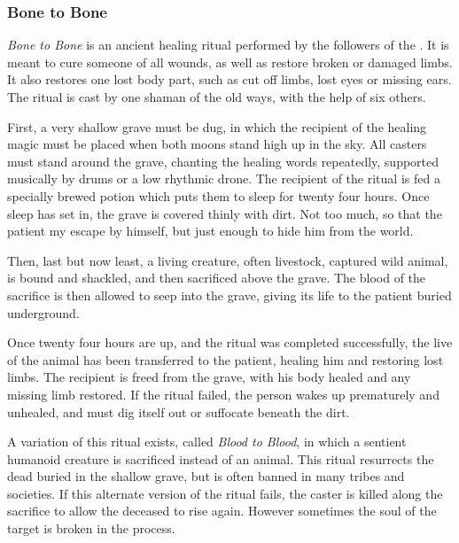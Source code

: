 \subsubsection{Bone to Bone}
\label{sec:Bone to Bone}


\emph{Bone to Bone} is an ancient healing ritual performed by the followers of
the . It is meant to cure someone of all wounds, as well
as restore broken or damaged limbs. It also restores one lost body part, such
as cut off limbs, lost eyes or missing ears. The ritual is cast by one shaman of
the old ways, with the help of six others.

First, a very shallow grave must be dug, in which the recipient of the healing
magic must be placed when both moons stand high up in the sky. All casters must
stand around the grave, chanting the healing words repeatedly, supported
musically by drums or a low rhythmic drone. The recipient of the ritual is fed
a specially brewed potion which puts them to sleep for twenty four hours. Once
sleep has set in, the grave is covered thinly with dirt. Not too much, so that
the patient my escape by himself, but just enough to hide him from the world.

Then, last but now least, a living creature, often livestock, captured wild
animal, is bound and shackled, and then sacrificed above the grave. The blood
of the sacrifice is then allowed to seep into the grave, giving its life to
the patient buried underground.

Once twenty four hours are up, and the ritual was completed successfully, the
live of the animal has been transferred to the patient, healing him and
restoring lost limbs. The recipient is freed from the grave, with his body
healed and any missing limb restored. If the ritual failed, the person wakes
up prematurely and unhealed, and must dig itself out or suffocate beneath the
dirt.

A variation of this ritual exists, called \emph{Blood to Blood}, in which
a sentient humanoid creature is sacrificed instead of an animal. This ritual
resurrects the dead buried in the shallow grave, but is often banned in many
tribes and societies. If this alternate version of the ritual fails, the
caster is killed along the sacrifice to allow the deceased to rise again.
However sometimes the soul of the target is broken in the process.

